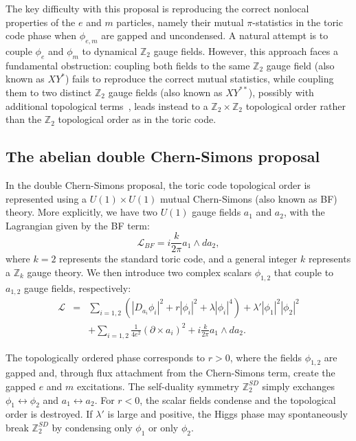 \documentclass[aps, prl, superscriptaddress, twocolumn,
notitlepage, longbibliography,
floatfix]{revtex4-2}
\newcommand{\1}{\text{\uppercase\expandafter{\romannumeral1}}}
\newcommand{\2}{\text{\uppercase\expandafter{\romannumeral2}}}
\newcommand{\3}{\text{\uppercase\expandafter{\romannumeral3}}}
\newcommand{\4}{\text{\uppercase\expandafter{\romannumeral4}}}
\newcommand{\5}{\text{\uppercase\expandafter{\romannumeral5}}}
\newcommand{\6}{\text{\uppercase\expandafter{\romannumeral6}}}
\def\Z{\mathbb{Z}}
\begin{document}
The key difficulty with this proposal is reproducing the correct nonlocal properties of the $e$ and $m$ particles, namely their mutual $\pi$-statistics in the toric code phase when $\phi_{e,m}$ are gapped and uncondensed. A natural attempt is to couple $\phi_e$ and $\phi_m$ to dynamical $\mathbb{Z}_2$ gauge fields. However, this approach faces a fundamental obstruction: coupling both fields to the same $\mathbb{Z}_2$ gauge field (also known as $XY^*$) fails to reproduce the correct mutual statistics, while coupling them to two distinct $\mathbb{Z}_2$ gauge fields (also known as $XY^{**}$), possibly with additional topological terms~\cite{DijkgraafWitten}, leads instead to a $\mathbb{Z}_2 \times \mathbb{Z}_2$ topological order rather than the $\mathbb{Z}_2$ topological order as in the toric code.



\subsection{The abelian double Chern-Simons proposal}

In the double Chern-Simons proposal, the toric code topological order is represented using a $U(1)\times U(1)$ mutual Chern-Simons (also known as BF) theory. More explicitly, we have two $U(1)$ gauge fields $a_1$ and $a_2$, with the Lagrangian given by the BF term:
\begin{equation}
\label{eq:BF}
    \mathcal{L}_{BF}=i\frac{k}{2\pi} a_1\wedge da_2,
\end{equation}
where $k=2$ represents the standard toric code, and a general integer $k$ represents a $\Z_k$ gauge theory. We then introduce two complex scalars $\phi_{1,2}$ that couple to $a_{1,2}$ gauge fields, respectively:
\begin{eqnarray}  \mathcal{L}&=&\sum_{i=1,2}\left(|D_{a_i}\phi_i|^2+r|\phi_i|^2+\lambda|\phi_i|^4\right)+\lambda'|\phi_1|^2|\phi_2|^2 \nonumber \\
& &+\sum_{i=1,2}\frac{1}{4e^2}(\partial\times a_i)^2+i\frac{k}{2\pi} a_1\wedge da_2.
\label{eq:BFHiggs}
\end{eqnarray}


The topologically ordered phase corresponds to $r>0$, where the fields $\phi_{1,2}$ are gapped and, through flux attachment from the Chern-Simons term, create the gapped $e$ and $m$ excitations. The self-duality symmetry $\mathbb{Z}_2^{SD}$ simply exchanges $\phi_1 \leftrightarrow \phi_2$ and $a_1 \leftrightarrow a_2$. For $r<0$, the scalar fields condense and the topological order is destroyed. If $\lambda'$ is large and positive, the Higgs phase may spontaneously break $\mathbb{Z}_2^{SD}$ by condensing only $\phi_1$ or only $\phi_2$.
\end{document}

